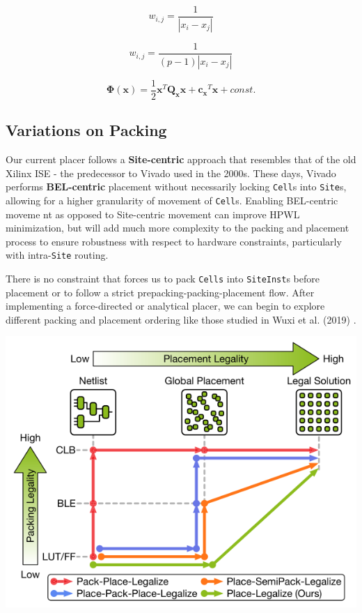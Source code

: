 \begin{equation}
    w_{i,j} = \frac{1}{|x_i - x_j|}
    \label{equ:weight}
\end{equation}

\begin{equation}
    w_{i,j} = \frac{1}{(p-1) |x_i - x_j|}
    \label{equ:weight_linearized}
\end{equation}

\begin{equation}
    \boldsymbol{\Phi} (\boldsymbol{x}) = \frac{1}{2} \boldsymbol{x}^T \boldsymbol{Q_x} \boldsymbol{x} + \boldsymbol{c_x}^T \boldsymbol{x} + const.
    \label{equ:quadratic}
\end{equation}



\subsection{Variations on Packing}
Our current placer follows a \textbf{Site-centric} approach that resembles that of the old Xilinx ISE - the predecessor to Vivado used in the 2000s.
These days, Vivado performs \textbf{BEL-centric} placement without necessarily locking \texttt{Cell}s into \texttt{Site}s, allowing for a higher granularity of movement of \texttt{Cell}s. 
Enabling BEL-centric moveme
nt as opposed to Site-centric movement can improve HPWL minimization, but will add much more complexity to the packing and placement process to ensure robustness with respect to hardware constraints, particularly with intra-\texttt{Site} routing.

There is no constraint that forces us to pack \texttt{Cells} into \texttt{SiteInst}s before placement or to follow a strict prepacking-packing-placement flow. 
After implementing a force-directed or analytical placer, we can begin to explore different packing and placement ordering like those studied in Wuxi et al. (2019) \cite{ExplicitPacking}.

{
    \centering
    \includegraphics[width=\columnwidth]{figures/future_work/legalization.png}
}
\vspace{0.25cm}

